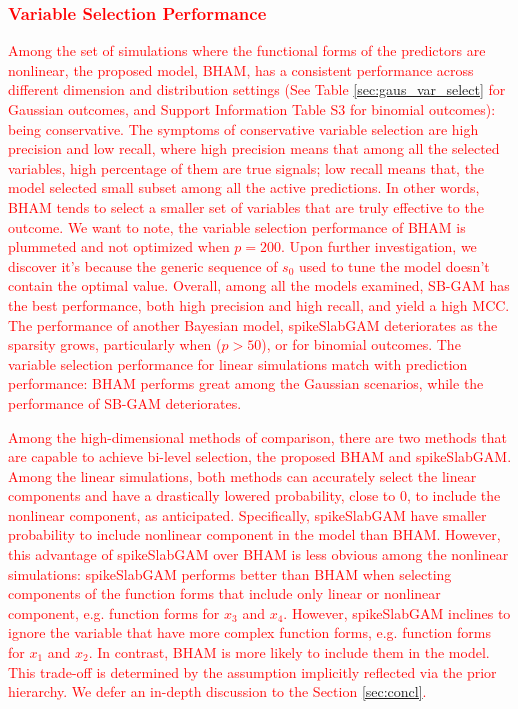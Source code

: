 \documentclass[AMA,STIX1COL,]{WileyNJD-v2}
\begin{document}
\textcolor{red}{\subsubsection{Variable Selection Performance}}
\textcolor{red}{Among the set of simulations where the functional forms of the predictors are nonlinear, the proposed model, BHAM, has a consistent performance across different dimension and distribution settings (See Table \ref{sec:gaus_var_select} for Gaussian outcomes, and Support Information Table S3 for binomial outcomes): being conservative. The symptoms of conservative variable selection are high precision and low recall, where high precision means that among all the selected variables, high percentage of them are true signals; low recall means that, the model selected small subset among all the active predictions. In other words, BHAM tends to select a smaller set of variables that are truly effective to the outcome. We want to note, the variable selection performance of BHAM is plummeted and not optimized when $p=200$. Upon further investigation, we discover it's because the generic sequence of $s_0$ used to tune the model doesn't contain the optimal value. Overall, among all the models examined, SB-GAM has the best performance, both high precision and high recall, and yield a high MCC. The performance of another Bayesian model, spikeSlabGAM deteriorates as the sparsity grows, particularly when ($p>50$), or for binomial outcomes. The variable selection performance for linear simulations match with prediction performance: BHAM performs great among the Gaussian scenarios, while the performance of SB-GAM deteriorates.}

\textcolor{red}{Among the high-dimensional methods of comparison, there are two methods that are capable to achieve bi-level selection, the proposed BHAM and spikeSlabGAM. Among the linear simulations, both methods can accurately select the linear components and have a drastically lowered probability, close to 0, to include the nonlinear component, as anticipated. Specifically, spikeSlabGAM have smaller probability to include nonlinear component in the model than BHAM. However, this advantage of spikeSlabGAM over BHAM is less obvious among the nonlinear simulations: spikeSlabGAM performs better than BHAM when selecting components of the function forms that include only linear or nonlinear component, e.g. function forms for $x_3$ and $x_4$. However, spikeSlabGAM inclines to ignore the variable that have more complex function forms, e.g. function forms for $x_1$ and $x_2$. In contrast, BHAM is more likely to include them in the model. This trade-off is determined by the assumption implicitly reflected via the prior hierarchy. We defer an in-depth discussion to the Section \ref{sec:concl}.}
\end{document}
